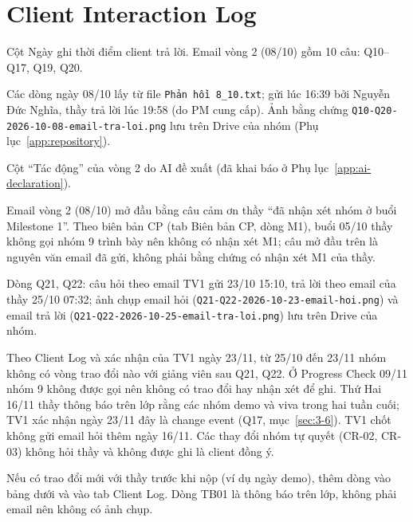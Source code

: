 \chapter{Client Interaction Log}
\label{app:client-log}

Cột Ngày ghi thời điểm client trả lời. Email vòng 2 (08/10) gồm 10 câu: Q10--Q17, Q19, Q20.

Các dòng ngày 08/10 lấy từ file \texttt{Phản hồi 8\_10.txt}; gửi lúc 16:39 bởi Nguyễn Đức Nghĩa, thầy trả lời lúc 19:58 (do PM cung cấp). Ảnh bằng chứng \texttt{Q10-Q20-2026-10-08-email-tra-loi.png} lưu trên Drive của nhóm (Phụ lục~\ref{app:repository}).

Cột \enquote{Tác động} của vòng 2 do AI đề xuất (đã khai báo ở Phụ lục~\ref{app:ai-declaration}).

Email vòng 2 (08/10) mở đầu bằng câu cảm ơn thầy \enquote{đã nhận xét nhóm ở buổi Milestone 1}. Theo biên bản CP (tab Biên bản CP, dòng M1), buổi 05/10 thầy không gọi nhóm 9 trình bày nên không có nhận xét M1; câu mở đầu trên là nguyên văn email đã gửi, không phải bằng chứng có nhận xét M1 của thầy.

Dòng Q21, Q22: câu hỏi theo email TV1 gửi 23/10 15:10, trả lời theo email của thầy 25/10 07:32; ảnh chụp email hỏi (\texttt{Q21-Q22-2026-10-23-email-hoi.png}) và email trả lời (\texttt{Q21-Q22-2026-10-25-email-tra-loi.png}) lưu trên Drive của nhóm.

Theo Client Log và xác nhận của TV1 ngày 23/11, từ 25/10 đến 23/11 nhóm không có vòng trao đổi nào với giảng viên sau Q21, Q22. Ở Progress Check 09/11 nhóm 9 không được gọi nên không có trao đổi hay nhận xét để ghi. Thứ Hai 16/11 thầy thông báo trên lớp rằng các nhóm demo và viva trong hai tuần cuối; TV1 xác nhận ngày 23/11 đây là change event (Q17, mục~\ref{sec:3-6}). TV1 chốt không gửi email hỏi thêm ngày 16/11. Các thay đổi nhóm tự quyết (CR-02, CR-03) không hỏi thầy và không được ghi là client đồng ý.

Nếu có trao đổi mới với thầy trước khi nộp (ví dụ ngày demo), thêm dòng vào bảng dưới và vào tab Client Log. Dòng TB01 là thông báo trên lớp, không phải email nên không có ảnh chụp.

